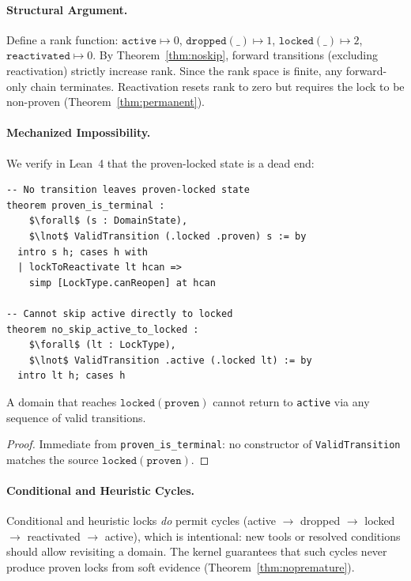 \documentclass[runningheads]{llncs}
\begin{document}
\paragraph{Structural Argument.}
Define a rank function: $\texttt{active} \mapsto 0$,
$\texttt{dropped}(\_) \mapsto 1$, $\texttt{locked}(\_) \mapsto 2$,
$\texttt{reactivated} \mapsto 0$.
By Theorem~\ref{thm:noskip}, forward transitions (excluding
reactivation) strictly increase rank. Since the rank space is
finite, any forward-only chain terminates. Reactivation resets
rank to zero but requires the lock to be non-proven
(Theorem~\ref{thm:permanent}).

\paragraph{Mechanized Impossibility.}
We verify in Lean~4 that the proven-locked state is a dead end:

\begin{lstlisting}[mathescape=true]
-- No transition leaves proven-locked state
theorem proven_is_terminal :
    $\forall$ (s : DomainState),
    $\lnot$ ValidTransition (.locked .proven) s := by
  intro s h; cases h with
  | lockToReactivate lt hcan =>
    simp [LockType.canReopen] at hcan

-- Cannot skip active directly to locked
theorem no_skip_active_to_locked :
    $\forall$ (lt : LockType),
    $\lnot$ ValidTransition .active (.locked lt) := by
  intro lt h; cases h
\end{lstlisting}

\begin{corollary}
\label{cor:nocycle}
A domain that reaches $\texttt{locked}(\texttt{proven})$ cannot
return to \texttt{active} via any sequence of valid transitions.
\end{corollary}

\begin{proof}
Immediate from \texttt{proven\_is\_terminal}: no constructor of
\texttt{ValidTransition} matches the source
$\texttt{locked}(\texttt{proven})$.
\end{proof}

\paragraph{Conditional and Heuristic Cycles.}
Conditional and heuristic locks \emph{do} permit cycles
(active $\to$ dropped $\to$ locked $\to$ reactivated $\to$
active), which is intentional: new tools or resolved conditions
should allow revisiting a domain. The kernel guarantees that
such cycles never produce proven locks from soft evidence
(Theorem~\ref{thm:nopremature}).
\end{document}
